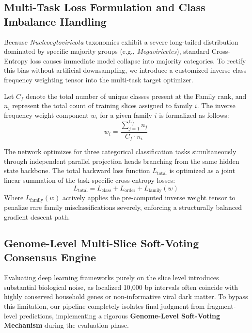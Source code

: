 \documentclass[11pt,a4paper]{article}
\begin{document}
\subsection{Multi-Task Loss Formulation and Class Imbalance Handling}
Because \textit{Nucleocytoviricota} taxonomies exhibit a severe long-tailed distribution dominated by specific majority groups (e.g., \textit{Megaviricetes}), standard Cross-Entropy loss causes immediate model collapse into majority categories. To rectify this bias without artificial downsampling, we introduce a customized inverse class frequency weighting tensor into the multi-task target optimizer.

Let $C_f$ denote the total number of unique classes present at the Family rank, and $n_i$ represent the total count of training slices assigned to family $i$. The inverse frequency weight component $w_i$ for a given family $i$ is formalized as follows:
\begin{equation}
w_i = \frac{\sum_{j=1}^{C_f} n_j}{C_f \cdot n_i}
\end{equation}

The network optimizes for three categorical classification tasks simultaneously through independent parallel projection heads branching from the same hidden state backbone. The total backward loss function $L_{\text{total}}$ is optimized as a joint linear summation of the task-specific cross-entropy losses:
\begin{equation}
L_{\text{total}} = L_{\text{class}} + L_{\text{order}} + L_{\text{family}}(w)
\end{equation}
Where $L_{\text{family}}(w)$ actively applies the pre-computed inverse weight tensor to penalize rare family misclassifications severely, enforcing a structurally balanced gradient descent path.

\subsection{Genome-Level Multi-Slice Soft-Voting Consensus Engine}
Evaluating deep learning frameworks purely on the slice level introduces substantial biological noise, as localized 10,000 bp intervals often coincide with highly conserved household genes or non-informative viral dark matter. To bypass this limitation, our pipeline completely isolates final judgment from fragment-level predictions, implementing a rigorous \textbf{Genome-Level Soft-Voting Mechanism} during the evaluation phase.
\end{document}

